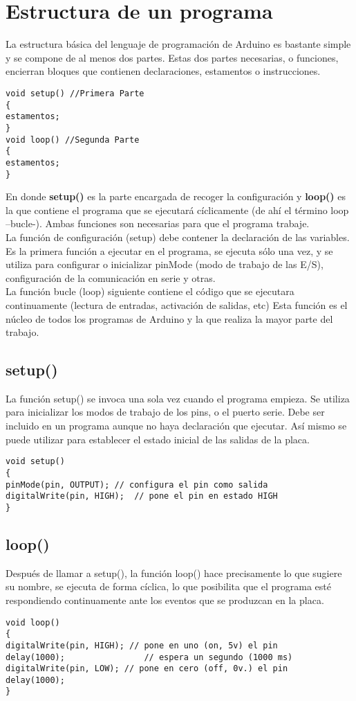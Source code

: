 \chapter{Estructura de un programa}

La estructura básica del lenguaje de programación de Arduino es bastante simple y se compone de al menos dos partes. Estas dos partes necesarias, o funciones, encierran bloques que contienen declaraciones, estamentos o instrucciones.
\begin{lstlisting}
void setup() //Primera Parte
{
estamentos;
}
void loop() //Segunda Parte
{
estamentos;
}
\end{lstlisting}
 En donde \textbf{setup()} es la parte encargada de recoger la configuración y \textbf{loop()} es la que contiene el programa que se ejecutará cíclicamente (de ahí el término loop –bucle-). Ambas funciones son necesarias para que el programa trabaje.\\
La función de configuración (setup) debe contener la declaración de las variables. Es la primera función a ejecutar en el programa, se ejecuta sólo una vez, y se utiliza para configurar o inicializar pinMode (modo de trabajo de las E/S), configuración de la comunicación en serie y otras.\\
La función bucle (loop) siguiente contiene el código que se ejecutara continuamente (lectura de entradas, activación de salidas, etc) Esta función es el núcleo de todos los programas de Arduino y la que realiza la mayor parte del trabajo.
\section{setup()}
La función setup() se invoca una sola vez cuando el programa empieza. Se utiliza para inicializar los modos de trabajo de los pins, o el puerto serie. Debe ser incluido en un programa aunque no haya declaración que ejecutar. Así mismo se puede utilizar para establecer el estado inicial de las salidas de la placa.
\begin{lstlisting}
void setup()
{
pinMode(pin, OUTPUT); // configura el pin como salida
digitalWrite(pin, HIGH);  // pone el pin en estado HIGH
}
\end{lstlisting}
\section{loop()}
Después de llamar a setup(), la función loop() hace precisamente lo que sugiere su nombre, se ejecuta de forma cíclica, lo que posibilita que el programa esté respondiendo continuamente ante los eventos que se produzcan en la placa.
\begin{lstlisting}
void loop()
{
digitalWrite(pin, HIGH); // pone en uno (on, 5v) el pin
delay(1000);            	// espera un segundo (1000 ms)
digitalWrite(pin, LOW); // pone en cero (off, 0v.) el pin
delay(1000);
}
\end{lstlisting}
